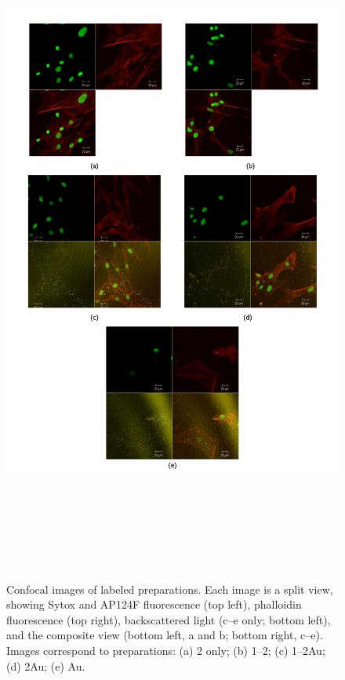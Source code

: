 \begin{figure}[htbp]
\centering
\includegraphics[keepaspectratio,width=\textwidth,height=9in]{ConfocalReps.pdf}
\caption{Confocal images of labeled preparations. Each image is a split view, showing Sytox and AP124F fluorescence (top left), phalloidin fluorescence (top right), backscattered light (c--e only; bottom left), and the composite view (bottom left, a and b; bottom right, c--e). Images correspond to preparations: (a) 2 only; (b) 1--2; (c) 1--2Au; (d) 2Au; (e) Au.}
\label{confocalcollage}
\end{figure}



